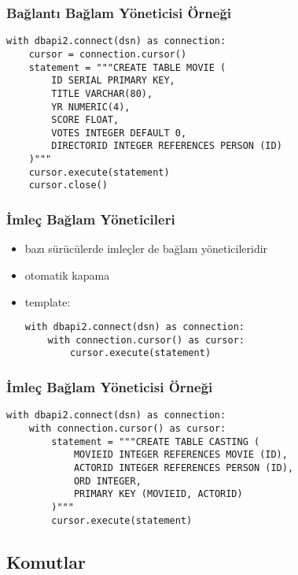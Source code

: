 \documentclass[dvipsnames]{beamer}
\theoremstyle{plain}
\begin{document}
\begin{frame}[fragile]
  \frametitle{Bağlantı Bağlam Yöneticisi Örneği}

  \begin{lstlisting}
with dbapi2.connect(dsn) as connection:
    cursor = connection.cursor()
    statement = """CREATE TABLE MOVIE (
        ID SERIAL PRIMARY KEY,
        TITLE VARCHAR(80),
        YR NUMERIC(4),
        SCORE FLOAT,
        VOTES INTEGER DEFAULT 0,
        DIRECTORID INTEGER REFERENCES PERSON (ID)
    )"""
    cursor.execute(statement)
    cursor.close()
  \end{lstlisting}
\end{frame}

\begin{frame}[fragile]
  \frametitle{İmleç Bağlam Yöneticileri}

  \begin{itemize}
    \item bazı sürücülerde imleçler de bağlam yöneticileridir
    \item otomatik kapama

    \medskip
    \item template:
    \begin{lstlisting}
with dbapi2.connect(dsn) as connection:
    with connection.cursor() as cursor:
        cursor.execute(statement)
    \end{lstlisting}
  \end{itemize}
\end{frame}

\begin{frame}[fragile]
  \frametitle{İmleç Bağlam Yöneticisi Örneği}

  \begin{lstlisting}
with dbapi2.connect(dsn) as connection:
    with connection.cursor() as cursor:
        statement = """CREATE TABLE CASTING (
            MOVIEID INTEGER REFERENCES MOVIE (ID),
            ACTORID INTEGER REFERENCES PERSON (ID),
            ORD INTEGER,
            PRIMARY KEY (MOVIEID, ACTORID)
        )"""
        cursor.execute(statement)
  \end{lstlisting}
\end{frame}

\subsection{Komutlar}
\end{document}
